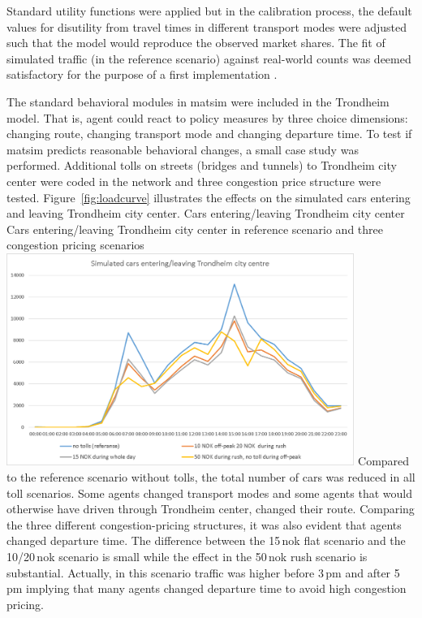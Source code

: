 Standard utility functions were applied but in the calibration process, the default values for disutility from travel times in different transport modes were adjusted such that the model would reproduce the observed market shares. The fit of simulated traffic (in the reference scenario) against real-world counts was deemed satisfactory for the purpose of a first implementation \citep[][]{Bockemuehl_TechRep_UH_2014}. 

The standard behavioral modules in \gls{matsim} were included in the Trondheim model. That is, agent could react to policy measures by three choice dimensions: changing route, changing transport mode and changing departure time. To test if \gls{matsim} predicts reasonable behavioral changes, a small case study was performed. Additional tolls on streets (bridges and tunnels) to Trondheim city center were coded in the network and three congestion price structure were tested. Figure~\ref{fig:loadcurve} illustrates the effects on the simulated cars entering and leaving Trondheim city center. 
%
\createfigure%
{Cars entering/leaving Trondheim city center}%
{Cars entering/leaving Trondheim city center in reference scenario and three congestion pricing scenarios \citep[source][]{Bockemuehl_TechRep_UH_2014}}%
{\label{fig:loadcurve}}%
{\includegraphics[width=0.85\textwidth, angle=0]{./using/figures/trondheimloadcurve.png}}%
{}
%
Compared to the reference scenario without tolls, the total number of cars was reduced in all toll scenarios. Some agents changed transport modes and some agents that would otherwise have driven through Trondheim center, changed their route. Comparing the three different congestion-pricing structures, it was also evident that agents changed departure time. The difference between the 15\,\gls{nok} flat scenario and the 10/20\,\gls{nok} scenario is small while the effect in the 50\,\gls{nok} rush scenario is substantial. Actually, in this scenario traffic was higher before 3\,pm and after 5\,pm implying that many agents changed departure time to avoid high congestion pricing.  











